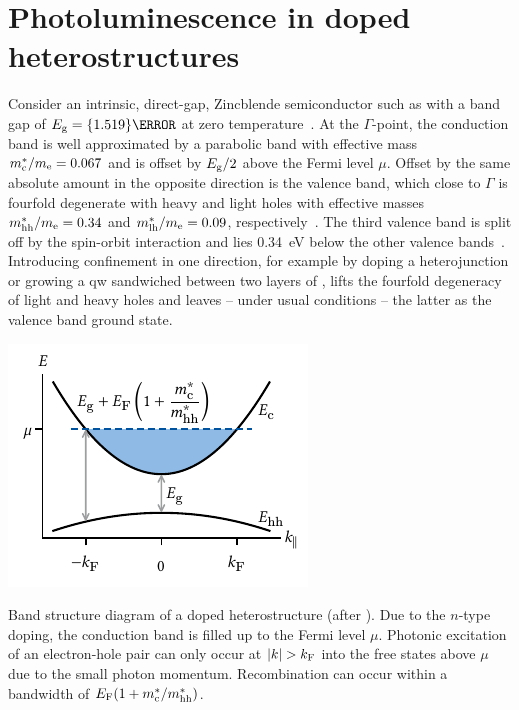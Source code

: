 \section{Photoluminescence in doped \texorpdfstring{\GaAsAlGaAs}{} heterostructures}\label{sec:exp:theory:pl}
Consider an intrinsic, direct-gap, Zincblende semiconductor such as  with a band gap of $E_{\mr{g}} = \qty{1.519}{\electronvolt}$ at zero temperature~\cite{Vurgaftman2001}.
At the $\Gamma$-point, the conduction band is well approximated by a parabolic band with effective mass $m^\ast_{\mathrm{c}}/m_{\mathrm{e}} = 0.067$ and is offset by $E_{\mathrm{g}}/2$ above the Fermi level $\mu$.
Offset by the same absolute amount in the opposite direction is the valence band, which close to $\Gamma$ is fourfold degenerate with heavy and light holes with effective masses $m^{\ast}_{\mathrm{hh}}/m_{\mathrm{e}} = 0.34$ and $m^{\ast}_{\mathrm{lh}}/m_{\mathrm{e}} = 0.09$, respectively~\cite{Miller1984a}.
The third valence band
is split off by the spin-orbit interaction and lies \qty{0.34}{\electronvolt} below the other valence bands~\cite{Davies2009}.
Introducing confinement in one direction, for example by doping a \GaAsAlGaAs heterojunction or growing a  \gls{qw} sandwiched between two layers of , lifts the fourfold degeneracy of light and heavy holes and leaves -- under usual conditions -- the latter as the valence band ground state.

\begin{marginfigure}
    \centering
    \includegraphics{img/pdf/experiment/2deg_sketch}
    \caption[]{
        Band structure diagram of a doped heterostructure (after ).
        Due to the $n$-type doping, the conduction band is filled up to the Fermi level $\mu$.
        Photonic excitation of an electron-hole pair can only occur at $\abs{k} > k_{\mathrm{F}}$ into the free states above $\mu$ due to the small photon momentum.
        Recombination can occur within a bandwidth of $E_{\mathrm{F}}(1 + m^\ast_{\mathrm{c}}/m^\ast_{\mathrm{hh}})$.
    }
    \label{fig:exp:theory:bandstructure:doped}
\end{marginfigure}

